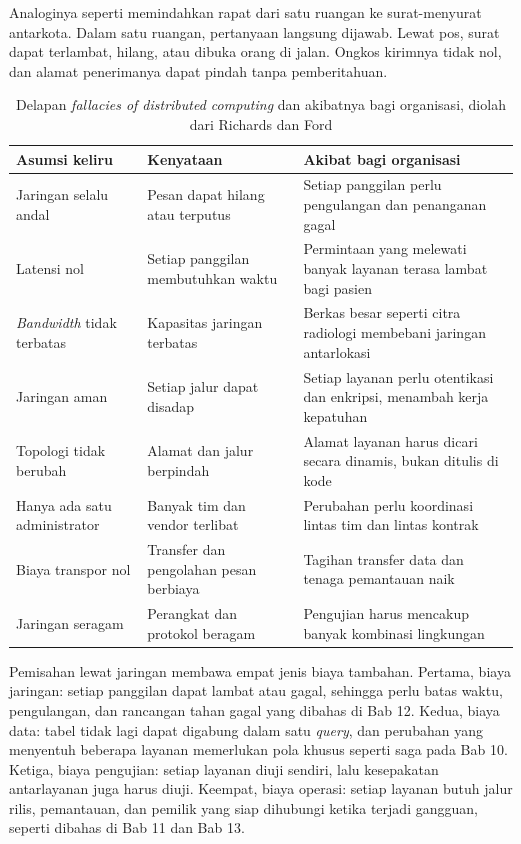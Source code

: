 Analoginya seperti memindahkan rapat dari satu ruangan ke surat-menyurat antarkota. Dalam satu
ruangan, pertanyaan langsung dijawab. Lewat pos, surat dapat terlambat, hilang, atau dibuka orang di
jalan. Ongkos kirimnya tidak nol, dan alamat penerimanya dapat pindah tanpa pemberitahuan.

\begin{table}[!htb]
  \centering
  \caption{Delapan \textit{fallacies of distributed computing} dan akibatnya bagi
           organisasi, diolah dari Richards dan Ford \cite{richards2025}}
  \label{tab:ch07-fallacies}
  \footnotesize
  \begin{tabularx}{\textwidth}{>{\raggedright\arraybackslash}p{3.0cm} >{\raggedright\arraybackslash}X >{\raggedright\arraybackslash}X}
    \hline
    \textbf{Asumsi keliru} & \textbf{Kenyataan} & \textbf{Akibat bagi organisasi} \\ \hline
    Jaringan selalu andal & Pesan dapat hilang atau terputus & Setiap panggilan perlu pengulangan
      dan penanganan gagal \\ \hline
    Latensi nol & Setiap panggilan membutuhkan waktu & Permintaan yang melewati banyak layanan
      terasa lambat bagi pasien \\ \hline
    \textit{Bandwidth} tidak terbatas & Kapasitas jaringan terbatas & Berkas besar seperti citra
      radiologi membebani jaringan antarlokasi \\ \hline
    Jaringan aman & Setiap jalur dapat disadap & Setiap layanan perlu otentikasi dan enkripsi,
      menambah kerja kepatuhan \\ \hline
    Topologi tidak berubah & Alamat dan jalur berpindah & Alamat layanan harus dicari secara
      dinamis, bukan ditulis di kode \\ \hline
    Hanya ada satu administrator & Banyak tim dan vendor terlibat & Perubahan perlu koordinasi
      lintas tim dan lintas kontrak \\ \hline
    Biaya transpor nol & Transfer dan pengolahan pesan berbiaya & Tagihan transfer data dan
      tenaga pemantauan naik \\ \hline
    Jaringan seragam & Perangkat dan protokol beragam & Pengujian harus mencakup banyak kombinasi
      lingkungan \\ \hline
  \end{tabularx}
\end{table}

Pemisahan lewat jaringan membawa empat jenis biaya tambahan. Pertama, biaya jaringan: setiap
panggilan dapat lambat atau gagal, sehingga perlu batas waktu, pengulangan, dan rancangan tahan gagal
yang dibahas di Bab 12. Kedua, biaya data: tabel tidak lagi dapat digabung dalam satu
\textit{query}, dan perubahan yang menyentuh beberapa layanan memerlukan pola khusus seperti saga
pada Bab 10. Ketiga, biaya pengujian: setiap layanan diuji sendiri, lalu kesepakatan antarlayanan
juga harus diuji. Keempat, biaya operasi: setiap layanan butuh jalur rilis, pemantauan, dan pemilik
yang siap dihubungi ketika terjadi gangguan, seperti dibahas di Bab 11 dan Bab 13.

